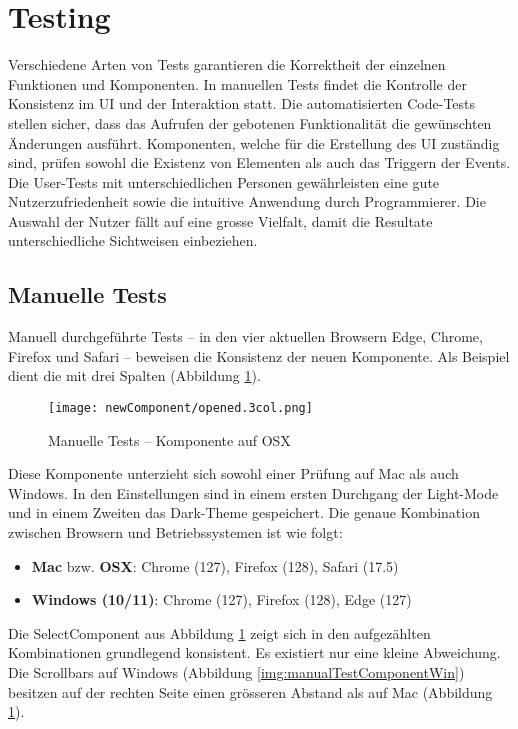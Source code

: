 \section{Testing}
\label{sec:testing}

Verschiedene Arten von Tests garantieren die Korrektheit der einzelnen Funktionen und Komponenten. 
In manuellen Tests findet die Kontrolle der Konsistenz im UI und der Interaktion statt. 
Die automatisierten Code-Tests stellen sicher, dass das Aufrufen der gebotenen Funktionalität die gewünschten Änderungen ausführt. 
Komponenten, welche für die Erstellung des UI zuständig sind, prüfen sowohl die Existenz von Elementen als auch das Triggern der Events. 
Die User-Tests mit unterschiedlichen Personen gewährleisten eine gute Nutzerzufriedenheit sowie die intuitive Anwendung durch Programmierer. 
Die Auswahl der Nutzer fällt auf eine grosse Vielfalt, damit die Resultate unterschiedliche Sichtweisen einbeziehen. 


\subsection{Manuelle Tests}
\label{sec:manuelTests}

Manuell durchgeführte Tests – in den vier aktuellen Browsern Edge, Chrome, Firefox und Safari – beweisen die Konsistenz der neuen Komponente. 
Als Beispiel dient die  mit drei Spalten (Abbildung \ref{img:manualTestComponentOsx}). 

\begin{figure}[!htb]
    \centering
    \texttt{[image: newComponent/opened.3col.png]}
    \caption{\centering Manuelle Tests – Komponente auf OSX}
    \label{img:manualTestComponentOsx}
\end{figure}

Diese Komponente unterzieht sich sowohl einer Prüfung auf Mac als auch Windows. 
In den Einstellungen sind in einem ersten Durchgang der Light-Mode und in einem Zweiten das Dark-Theme gespeichert. 
Die genaue Kombination zwischen Browsern und Betriebssystemen ist wie folgt: 

\begin{itemize}
    \item \textbf{Mac} bzw. \textbf{OSX}: Chrome (127), Firefox (128), Safari (17.5)
    \item \textbf{Windows (10/11)}: Chrome (127), Firefox (128), Edge (127)
\end{itemize}

Die SelectComponent aus Abbildung \ref{img:manualTestComponentOsx} zeigt sich in den aufgezählten Kombinationen grundlegend konsistent. 
Es existiert nur eine kleine Abweichung. 
Die Scrollbars auf Windows (Abbildung \ref{img:manualTestComponentWin}) besitzen auf der rechten Seite einen grösseren Abstand als auf Mac (Abbildung \ref{img:manualTestComponentOsx}). 

